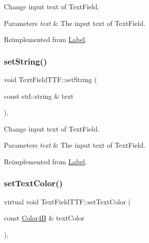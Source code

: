 Change input text of Text\+Field. 
\begin{DoxyParams}{Parameters}
{\em text} & The input text of Text\+Field. \\
\hline
\end{DoxyParams}


Reimplemented from \hyperlink{classLabel_a01631cdec4595921e78fb085a88118d9}{Label}.

\mbox{\label{classTextFieldTTF_a9c8fcddd94799ace845dc808d1246d7b}} 
\subsubsection{\texorpdfstring{set\+String()}{setString()}\hspace{0.1cm}{\footnotesize\ttfamily [2/2]}}
{\footnotesize\ttfamily void Text\+Field\+T\+T\+F\+::set\+String (\begin{DoxyParamCaption}\item[{const std\+::string \&}]{text }\end{DoxyParamCaption})\hspace{0.3cm}{\ttfamily [override]}, {\ttfamily [virtual]}}

Change input text of Text\+Field. 
\begin{DoxyParams}{Parameters}
{\em text} & The input text of Text\+Field. \\
\hline
\end{DoxyParams}


Reimplemented from \hyperlink{classLabel_a01631cdec4595921e78fb085a88118d9}{Label}.

\mbox{\label{classTextFieldTTF_a3ddb9d26ec68e2b25bcdda2a1628f267}} 
\subsubsection{\texorpdfstring{set\+Text\+Color()}{setTextColor()}\hspace{0.1cm}{\footnotesize\ttfamily [1/2]}}
{\footnotesize\ttfamily virtual void Text\+Field\+T\+T\+F\+::set\+Text\+Color (\begin{DoxyParamCaption}\item[{const \hyperlink{structColor4B}{Color4B} \&}]{text\+Color }\end{DoxyParamCaption})\hspace{0.3cm}{\ttfamily [override]}, {\ttfamily [virtual]}}

